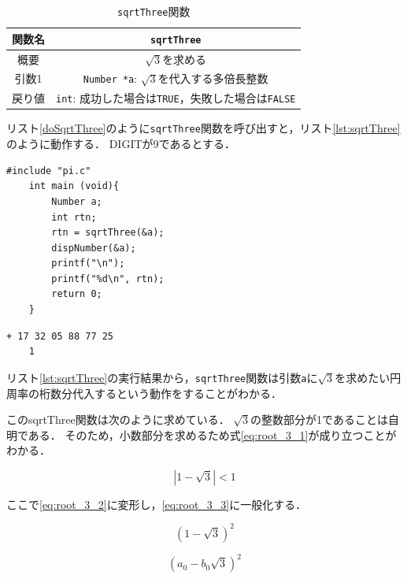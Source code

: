 \documentclass[a4paper,11pt,dvipdfmx]{jsarticle}
\begin{document}
\begin{table}[H]
\centering
\caption{\texttt{sqrtThree}関数}
\label{table:lst:sqrtThree}
\begin{tabular}{c||c}
\hline
関数名    & \texttt{sqrtThree}   \\
\hline
概要    & $\sqrt{3}$を求める   \\
\hline
引数1   & \texttt{Number *a}: $\sqrt{3}$を代入する多倍長整数  \\
\hline
戻り値    & \texttt{int}: 成功した場合は\texttt{TRUE}，失敗した場合は\texttt{FALSE}   \\
\hline
\end{tabular}
\end{table}

リスト\ref{doSqrtThree}のように\texttt{sqrtThree}関数を呼び出すと，リスト\ref{lst:sqrtThree}のように動作する．
DIGITが9であるとする．

\begin{lstlisting}[caption=\texttt{sqrtThree}関数の呼び出し,label=doSqrtThree]
    #include "pi.c"
    int main (void){
        Number a;
        int rtn;
        rtn = sqrtThree(&a);
        dispNumber(&a);
        printf("\n");
        printf("%d\n", rtn);
        return 0;
    }
\end{lstlisting}

\begin{lstlisting}[caption=リスト\ref{doSqrtThree}の実行結果,label=lst:sqrtThree]
    + 17 32 05 88 77 25
    1
\end{lstlisting}

リスト\ref{lst:sqrtThree}の実行結果から，\texttt{sqrtThree}関数は引数\texttt{a}に$\sqrt{3}$を求めたい円周率の桁数分代入するという動作をすることがわかる．

このsqrtThree関数は次のように求めている．
$\sqrt{3}$の整数部分が1であることは自明である．
そのため，小数部分を求めるため式\eqref{eq:root_3_1}が成り立つことがわかる．

\begin{equation}
    |1-\sqrt{3}| < 1
    \label{eq:root_3_1}
\end{equation}

ここで\eqref{eq:root_3_2}に変形し，\eqref{eq:root_3_3}に一般化する．

\begin{equation}
    (1-\sqrt{3})^2
    \label{eq:root_3_2}
\end{equation}

\begin{equation}
    (a_0 - b_0\sqrt{3}) ^ 2
    \label{eq:root_3_3}
\end{equation}
\end{document}
